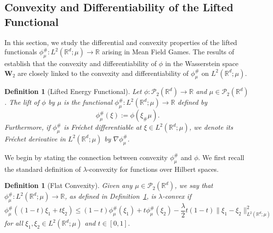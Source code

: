 \documentclass[11pt,a4paper]{amsart}
\newcommand{\1}{\mathds{1}}
\newcommand{\R}{{\mathbb R}}
\newtheorem{definition}[theorem]{\textbf{Definition}}
\numberwithin{equation}{section}
\begin{document}

\subsection{Convexity and Differentiability of the Lifted Functional}

In this section, we study the differential and convexity properties of the lifted functionals $\phi_{\mu}^{\#} : L^2(\mathbb{R}^d; \mu) \to \mathbb{R}$ arising in Mean Field Games. The results of \cite{gangbo2022global,gangbo2019differentiability,carmona2018probabilistic} establish that the convexity and differentiability of $ \phi $ in the Wasserstein space $ \mathbf{W}_2 $ are closely linked to the convexity and differentiability of $ \phi_{\mu}^{\#} $ on $ L^2(\mathbb{R}^d; \mu) $.

\smallskip

\begin{definition}[Lifted Energy Functional]  \label{lift_def}
Let $\phi : \mathcal{P}_2(\mathbb{R}^d) \to \mathbb{R}$ and $\mu \in \mathcal{P}_2(\mathbb{R}^d)$. The \textnormal{lift} of $\phi$ \textnormal{by} $\mu$ is the functional $\phi^{\#}_{\mu} : L^2(\mathbb{R}^d; \mu) \to \mathbb{R}$ defined by
\[
\phi^{\#}_{\mu}(\xi) := \phi(\xi_{\#} \mu).
\]
\noindent Furthermore, if $\phi^{\#}_{\mu}$ is Fréchet differentiable at $\xi \in L^2(\mathbb{R}^d;\mu)$, we denote its Fréchet derivative in $L^2(\mathbb{R}^d; \mu)$ by $\nabla \phi^{\#}_{\mu}$.
\end{definition}


We begin by stating the connection between convexity $\phi^{\#}_{\mu}$ and $\phi$. We first recall the standard definition of $\lambda$-convexity for functions over Hilbert spaces. 

\smallskip
\begin{definition}[Flat Convexity]
Given any $\mu \in \mathcal{P}_2(\mathbb{R}^d)$, we say that $\phi^{\#}_{\mu} : L^2(\mathbb{R}^d; \mu) \to \mathbb{R}$, as defined in Definition~\ref{lift_def}, is $\lambda$-convex if
\[
\phi^{\#}_{\mu}((1 - t)\xi_1 + t \xi_2)
\leq (1 - t) \phi^{\#}_{\mu}(\xi_1) + t \phi^{\#}_{\mu}(\xi_2)
- \frac{\lambda}{2} t(1 - t) \|\xi_1 - \xi_2\|^2_{L^2(\mathbb{R}^d; \mu)}
\]
for all $\xi_1, \xi_2 \in L^2(\mathbb{R}^d; \mu)$ and $t \in [0,1]$.
\end{definition}
\end{document}
